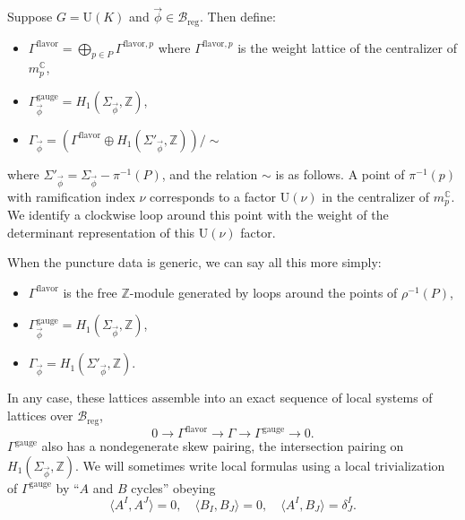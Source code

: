 \documentclass[12pt,letterpaper,reqno]{article}
\numberwithin{equation}{section}
\newcommand{\cB}{\ensuremath{\mathcal B}}
\newcommand{\C}{\ensuremath{\mathbb C}}
\newcommand{\Z}{\ensuremath{\mathbb Z}}
\newcommand{\reg}{\mathrm{reg}}
\newcommand{\gauge}{\mathrm{gauge}}
\newcommand{\flavor}{\mathrm{flavor}}
\newcommand{\IP}[1]{\langle#1\rangle}
\newcommand{\vphi}{{\vec\phi}}
\newcommand{\U}{\mathrm{U}}
\begin{document}
\begin{defn}[Charge lattices for $G = \U(K)$]
Suppose $G = \U(K)$ and $\vphi \in \cB_\reg$. 
Then define:
\begin{itemize}
 \item $\Gamma^\flavor = \bigoplus_{p \in P} \Gamma^{\flavor,p}$ where $\Gamma^{\flavor,p}$
 is the weight lattice of the centralizer of $m^\C_p$,
 \item $\Gamma_\vphi^\gauge = H_1(\Sigma_\vphi, \Z)$,
 \item $\Gamma_\vphi = \left( \Gamma^\flavor \oplus H_1(\Sigma'_\vphi,\Z) \right) / \sim$
\end{itemize}
where $\Sigma'_\vphi = \Sigma_\vphi - \pi^{-1}(P)$,
and the relation $\sim$ is as follows. A point of $\pi^{-1}(p)$ with ramification index $\nu$ corresponds to a factor $\U(\nu)$ in the centralizer of $m_p^\C$. We identify a clockwise 
loop around this point with the weight of the 
determinant representation of this $\U(\nu)$ factor.
\end{defn}

\begin{example}
When the puncture data is generic, we can say all this
more simply:
\begin{itemize}
 \item $\Gamma^\flavor$ is the free $\Z$-module generated
by loops around the points of $\rho^{-1}(P)$,
 \item $\Gamma_\vphi^\gauge = H_1(\Sigma_\vphi, \Z)$,
 \item $\Gamma_\vphi = H_1(\Sigma'_\vphi, \Z)$.
\end{itemize}
\end{example}

In any case, these lattices assemble into an exact 
sequence of local systems of lattices over $\cB_\reg$,
\begin{equation} \label{eq:lattice-extension}
0 \to \Gamma^\flavor \to \Gamma \to \Gamma^\gauge \to 0.
\end{equation}
$\Gamma^\gauge$ also has a nondegenerate skew pairing,
the intersection pairing on $H_1(\Sigma_\vphi, \Z)$.
We will sometimes write local formulas using a local
trivialization of $\Gamma^\gauge$ by ``$A$ and $B$ cycles''
obeying
\begin{equation}
  \IP{A^I, A^J}=0, \quad \IP{B_I, B_J}=0, \quad \IP{A^I,B_J} = \delta^I_J.
\end{equation}
\end{document}
